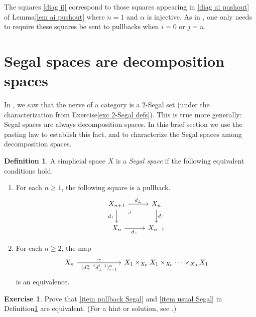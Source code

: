 \documentclass{conm-p-l}
\theoremstyle{definition}
\newtheorem{definition}[theorem]{Definition}
\newtheorem{exercise}[theorem]{Exercise}
\theoremstyle{remark}
\begin{document}
The squares \eqref{diag ij} correspond to those squares appearing in \eqref{diag ai pushout} of Lemma\nobreakspace \ref {lem ai pushout} where $n=1$ and $\alpha$ is injective.
As in \cite[Proposition 2.3.2]{DyckerhoffKapranov:HSS}, one only needs to require these squares be sent to pullbacks when $i=0$ or $j=n$.

\section{Segal spaces are decomposition spaces}\label{sec segal spaces}

In \cite{Stern:BIRS}, we saw that the nerve of a category is a 2-Segal set (under the characterization from Exercise\nobreakspace \ref {exc 2-Segal defs}).
This is true more generally: Segal spaces \cite{Rezk:MHTHT,Segal:CCT} are always decomposition spaces.
In this brief section we use the pasting law to establish this fact, and to characterize the Segal spaces among decomposition spaces.

\begin{definition}\label{def Segal}
A simplicial space $X$ is a \emph{Segal space} if the following equivalent conditions hold:
\begin{enumerate}
\item \label{item pullback Segal} For each $n\geq 1$, the following square is a pullback. 
\[ \begin{tikzcd}
X_{n+1} \ar[dr, phantom, "\lrcorner" very near start] \rar{d_\bot} \dar[swap]{d_\top} & X_n \dar{d_\top} \\
X_n \rar[swap]{d_\bot} & X_{n-1}
\end{tikzcd} \]
\item For each $n\geq 2$, the map
\[
\begin{tikzcd}[column sep=2.2cm]
X_n \rar["(d_\top^{n-i} d_\bot^{i-1})_{i=1}^n" swap, "\simeq"] & X_1 \times_{X_0} X_1 \times_{X_0} \dots  \times_{X_0} X_1
\end{tikzcd} 
\]
is an equivalence. \label{item usual Segal}
\end{enumerate}
\end{definition}

\begin{exercise}
Prove that \eqref{item pullback Segal} and \eqref{item usual Segal} in Definition\nobreakspace \ref {def Segal} are equivalent. (For a hint or solution, see \cite[Lemma 2.10]{GKT1}.)
\end{exercise}
\end{document}

